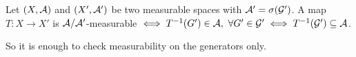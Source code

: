 \begin{lem}
	Let $(X, \mathcal{A})$ and $(X', \mathcal{A}')$ be two measurable spaces with $\mathcal{A}' = \sigma(\mathcal{G}')$. A map $T: X \to X'$ is $\mathcal{A}/\mathcal{A}'$-measurable $\iff T^{-1}(G') \in \mathcal{A},\ \forall G' \in \mathcal{G}' \iff T^{-1}(\mathcal{G}') \subseteq \mathcal{A}$.
\end{lem}

So it is enough to check measurability on the generators only.